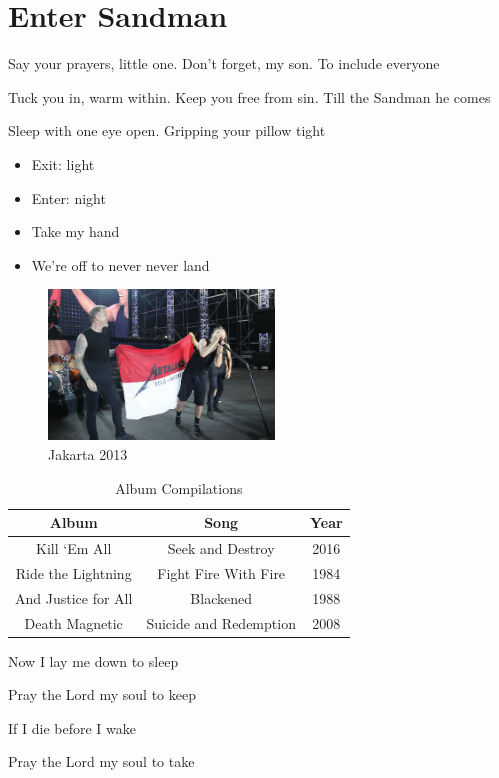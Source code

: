\documentclass{article}
\begin{document}
\section{Enter Sandman}

Say your prayers, little one. Don't forget, my son. To include everyone


Tuck you in, warm within. Keep you free from sin. Till the Sandman he comes


Sleep with one eye open. Gripping your pillow tight \cite{odyssey}

\begin{itemize}
\item Exit: light
\item Enter: night
\item Take my hand
\item We're off to never never land
\end{itemize}

\begin{figure}[htb]
\begin{center}
\includegraphics[width=6.0cm]{Metallica.eps}
\caption{Jakarta 2013}
\label{fig:image1}
\end{center}
\end{figure}

\begin{table}[htb]
\caption{Album Compilations}
\label{tab:member}
\begin{center}
\begin{tabular}{|c|c|c|}
	\hline
Album & Song & Year \\
\hline \hline
Kill ‘Em All & Seek and Destroy & 2016 \\
\hline
Ride the Lightning & Fight Fire With Fire & 1984 \\
\hline
And Justice for All & Blackened & 1988 \\
\hline
Death Magnetic & Suicide and Redemption & 2008 \\
\hline
\end{tabular}
\end{center}
\end{table}


Now I lay me down to sleep

Pray the Lord my soul to keep

If I die before I wake

Pray the Lord my soul to take


\nocite{*}


\end{document}
